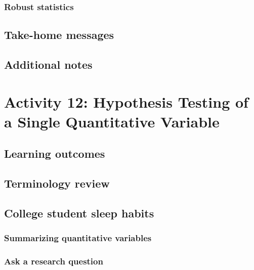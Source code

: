 \documentclass[
]{report}
\begin{document}
\subsubsection*{Robust statistics}\label{robust-statistics}

\subsection{Take-home messages}\label{take-home-messages-10}

\subsection{Additional notes}\label{additional-notes-10}

\section{Activity 12: Hypothesis Testing of a Single Quantitative Variable}\label{activity-12-hypothesis-testing-of-a-single-quantitative-variable}

\subsection{Learning outcomes}\label{learning-outcomes-12}

\subsection{Terminology review}\label{terminology-review-10}

\subsection{College student sleep habits}\label{college-student-sleep-habits}

\subsubsection*{Summarizing quantitative variables}\label{summarizing-quantitative-variables-1}

\subsubsection*{Ask a research question}\label{ask-a-research-question-1}
\end{document}

